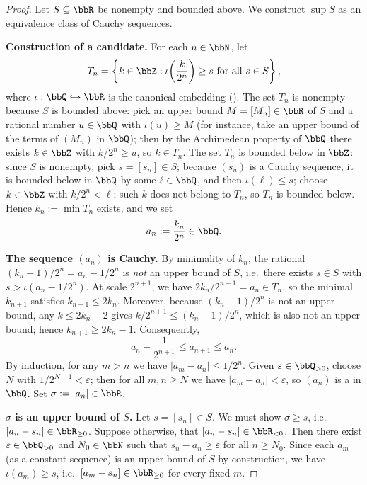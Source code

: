 \begin{proof}
    Let $S \subseteq \bbR$ be nonempty and bounded above. We construct $\sup S$ as an equivalence class of Cauchy sequences.

    \textbf{Construction of a candidate.}
    For each $n \in \bbN$, let
    $$T_n = \left\{ k \in \bbZ : \iota\!\left(\frac{k}{2^n}\right) \ge s \text{ for all } s \in S \right\},$$
    where $\iota: \bbQ \hookrightarrow \bbR$ is the canonical embedding (). The set $T_n$ is nonempty because $S$ is bounded above: pick an upper bound $M = [M_n] \in \bbR$ of $S$ and a rational number $u \in \bbQ$ with $\iota(u) \ge M$ (for instance, take an upper bound of the terms of $(M_n)$ in $\bbQ$); then by the Archimedean property of $\bbQ$ there exists $k \in \bbZ$ with $k/2^n \ge u$, so $k \in T_n$. The set $T_n$ is bounded below in $\bbZ$: since $S$ is nonempty, pick $s = [s_n] \in S$; because $(s_n)$ is a Cauchy sequence, it is bounded below in $\bbQ$ by some $\ell \in \bbQ$, and then $\iota(\ell) \le s$; choose $k \in \bbZ$ with $k/2^n < \ell$; such $k$ does not belong to $T_n$, so $T_n$ is bounded below. Hence $k_n := \min T_n$ exists, and we set
    $$a_n := \frac{k_n}{2^n} \in \bbQ.$$

    \textbf{The sequence $(a_n)$ is Cauchy.}
    By minimality of $k_n$, the rational $(k_n-1)/2^n = a_n - 1/2^n$ is \emph{not} an upper bound of $S$, i.e.\ there exists $s \in S$ with $s > \iota(a_n - 1/2^n)$. At scale $2^{n+1}$, we have $2k_n/2^{n+1} = a_n \in T_n$, so the minimal $k_{n+1}$ satisfies $k_{n+1} \le 2k_n$. Moreover, because $(k_n-1)/2^n$ is not an upper bound, any $k \le 2k_n - 2$ gives $k/2^{n+1} \le (k_n-1)/2^n$, which is also not an upper bound; hence $k_{n+1} \ge 2k_n - 1$. Consequently,
    $$a_n - \frac{1}{2^{n+1}} \le a_{n+1} \le a_n.$$
    By induction, for any $m > n$ we have $|a_m - a_n| \le 1/2^n$. Given $\varepsilon \in \bbQ_{>0}$, choose $N$ with $1/2^{N-1} < \varepsilon$; then for all $m, n \ge N$ we have $|a_m - a_n| < \varepsilon$, so $(a_n)$ is a  in $\bbQ$. Set $\sigma := [a_n] \in \bbR$.

    \textbf{$\sigma$ is an upper bound of $S$.}
    Let $s = [s_n] \in S$. We must show $\sigma \ge s$, i.e.\ $[a_n - s_n] \in \bbR_{\ge 0}$. Suppose otherwise, that $[a_n - s_n] \in \bbR_{<0}$. Then there exist $\varepsilon \in \bbQ_{>0}$ and $N_0 \in \bbN$ such that $s_n - a_n \ge \varepsilon$ for all $n \ge N_0$. Since each $a_m$ (as a constant sequence) is an upper bound of $S$ by construction, we have $\iota(a_m) \ge s$, i.e.\ $[a_m - s_n] \in \bbR_{\ge 0}$ for every fixed $m$.


\end{proof}
